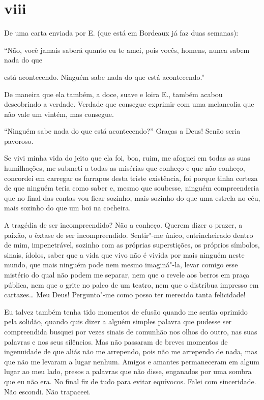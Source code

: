 \section{viii}

De uma carta enviada por E. (que está em Bordeaux já faz duas semanas):

``Não, você jamais saberá quanto eu te amei, pois vocês, homens, nunca
sabem nada do que \linebreak

\noindent{}está acontecendo. Ninguém sabe nada do que está
acontecendo.''

De maneira que ela também, a doce, suave e loira E., também acabou
descobrindo a verdade. Verdade que consegue exprimir com uma
melancolia que não vale um vintém, mas consegue.

``Ninguém sabe nada do que está acontecendo?'' Graças a Deus! Senão
seria pavoroso.

Se vivi minha vida do jeito que ela foi, boa, ruim, me
afoguei em todas as suas humilhações, me submeti a todas as
misérias que conheço e que não conheço, concordei em carregar os
farrapos desta triste existência, foi porque tinha certeza de que
ninguém teria como saber e, mesmo que soubesse, ninguém
compreenderia que no final das contas vou ficar sozinho, mais sozinho
do que uma estrela no céu, mais sozinho do que um boi na cocheira.

A tragédia de ser incompreendido? Não a conheço. Querem dizer o prazer,
a paixão, o êxtase de ser incompreendido. Sentir"-me único,
entrincheirado dentro de mim, impenetrável, sozinho com as próprias
superstições, os próprios símbolos, sinais, ídolos, saber que a vida
que vivo não é vivida por mais ninguém neste mundo, que mais ninguém
pode nem mesmo imaginá"-la, levar comigo esse mistério do qual não podem
me separar, nem que o revele aos berros em praça pública, nem que
o grite no palco de um teatro, nem que o distribua impresso em
cartazes\ldots{} Meu Deus! Pergunto"-me como posso ter merecido tanta
felicidade!

Eu talvez também tenha tido momentos de efusão quando me sentia
oprimido pela solidão, quando quis dizer a alguém simples palavra
que pudesse ser compreendida busquei por vezes sinais de
comunhão nos olhos do outro, nas suas palavras e nos seus silêncios. Mas
não passaram de breves momentos de ingenuidade de que aliás não me
arrependo, pois não me arrependo de nada, mas que não me levaram a lugar
nenhum. Amigos e amantes permaneceram em algum lugar ao meu lado, presos
a palavras que não disse, enganados por uma sombra que eu não era. No
final fiz de tudo para evitar equívocos. Falei com sinceridade. Não
escondi. Não trapaceei.

